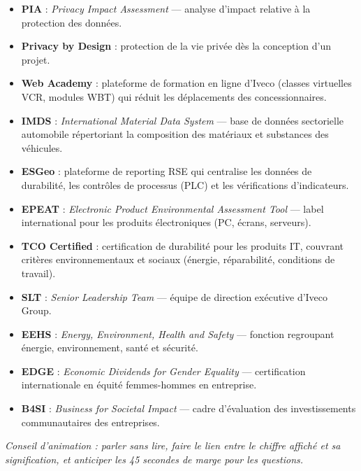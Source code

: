 \documentclass[12pt,a4paper]{article}
\begin{document}
\begin{itemize}
  \item \textbf{PIA} : \textit{Privacy Impact Assessment} --- analyse d'impact relative à la protection des données.
  \item \textbf{Privacy by Design} : protection de la vie privée dès la conception d'un projet.
  \item \textbf{Web Academy} : plateforme de formation en ligne d'Iveco (classes virtuelles VCR, modules WBT) qui réduit les déplacements des concessionnaires.
  \item \textbf{IMDS} : \textit{International Material Data System} --- base de données sectorielle automobile répertoriant la composition des matériaux et substances des véhicules.
  \item \textbf{ESGeo} : plateforme de reporting RSE qui centralise les données de durabilité, les contrôles de processus (PLC) et les vérifications d'indicateurs.
  \item \textbf{EPEAT} : \textit{Electronic Product Environmental Assessment Tool} --- label international pour les produits électroniques (PC, écrans, serveurs).
  \item \textbf{TCO Certified} : certification de durabilité pour les produits IT, couvrant critères environnementaux et sociaux (énergie, réparabilité, conditions de travail).
  \item \textbf{SLT} : \textit{Senior Leadership Team} --- équipe de direction exécutive d'Iveco Group.
  \item \textbf{EEHS} : \textit{Energy, Environment, Health and Safety} --- fonction regroupant énergie, environnement, santé et sécurité.
  \item \textbf{EDGE} : \textit{Economic Dividends for Gender Equality} --- certification internationale en équité femmes-hommes en entreprise.
  \item \textbf{B4SI} : \textit{Business for Societal Impact} --- cadre d'évaluation des investissements communautaires des entreprises.
\end{itemize}

\vfill
\noindent\textit{Conseil d'animation : parler sans lire, faire le lien entre le chiffre affiché et sa signification, et anticiper les 45 secondes de marge pour les questions.}
\end{document}
